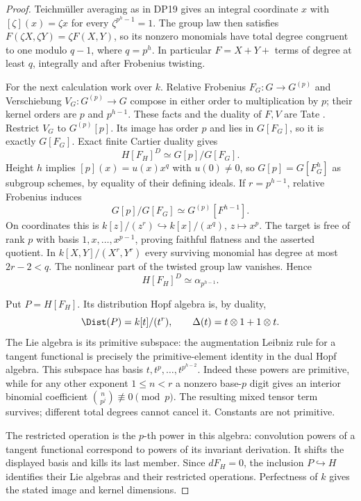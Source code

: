 \documentclass[11pt,a4paper]{article}
\theoremstyle{definition}\newtheorem{remark}[theorem]{Remark}
\begin{document}
\begin{proof}
Teichm\"uller averaging as in DP19 gives an integral coordinate $x$ with $[\zeta](x)=\zeta x$ for every $\zeta^{p^h-1}=1$. The group law then satisfies $F(\zeta X,\zeta Y)=\zeta F(X,Y)$, so its nonzero monomials have total degree congruent to one modulo $q-1$, where $q=p^h$. In particular $F=X+Y+$ terms of degree at least $q$, integrally and after Frobenius twisting.

For the next calculation work over $k$. Relative Frobenius $F_G:G\to G^{(p)}$ and Verschiebung $V_G:G^{(p)}\to G$ compose in either order to multiplication by $p$; their kernel orders are $p$ and $p^{h-1}$. These facts and the duality of $F,V$ are Tate \cite[\S2.2, diagram (3), pp.~163--164; \S2.3, Proposition 3, p.~166]{Tate67}. Restrict $V_G$ to $G^{(p)}[p]$. Its image has order $p$ and lies in $G[F_G]$, so it is exactly $G[F_G]$. Exact finite Cartier duality \cite[\S1.2--1.3, pp.~159--160]{Tate67} gives
\[
 H[F_H]^D\simeq G[p]/G[F_G].
\]
Height $h$ implies $[p](x)=u(x)x^q$ with $u(0)\ne0$, so $G[p]=G[F_G^h]$ as subgroup schemes, by equality of their defining ideals. If $r=p^{h-1}$, relative Frobenius induces
\[
 G[p]/G[F_G]\simeq G^{(p)}[F^{h-1}].
\]
On coordinates this is $k[z]/(z^r)\hookrightarrow k[x]/(x^q)$, $z\mapsto x^p$. The target is free of rank $p$ with basis $1,x,\ldots,x^{p-1}$, proving faithful flatness and the asserted quotient. In $k[X,Y]/(X^r,Y^r)$ every surviving monomial has degree at most $2r-2<q$. The nonlinear part of the twisted group law vanishes. Hence
\begin{equation}\label{eq:dual-F-kernel}
 H[F_H]^D\simeq\alpha_{p^{h-1}}.
\end{equation}

Put $P=H[F_H]$. Its distribution Hopf algebra is, by duality,
\[
 \Dist(P)=k[t]/(t^r),\qquad\Delta(t)=t\otimes1+1\otimes t.
\]
The Lie algebra is its primitive subspace: the augmentation Leibniz rule for a tangent functional is precisely the primitive-element identity in the dual Hopf algebra. This subspace has basis $t,t^p,\ldots,t^{p^{h-2}}$. Indeed these powers are primitive, while for any other exponent $1\le n<r$ a nonzero base-$p$ digit gives an interior binomial coefficient $\binom n{p^j}\not\equiv0\pmod p$. The resulting mixed tensor term survives; different total degrees cannot cancel it. Constants are not primitive.

The restricted operation is the $p$-th power in this algebra: convolution powers of a tangent functional correspond to powers of its invariant derivation. It shifts the displayed basis and kills its last member. Since $dF_H=0$, the inclusion $P\hookrightarrow H$ identifies their Lie algebras and their restricted operations. Perfectness of $k$ gives the stated image and kernel dimensions.


\end{proof}
\end{document}

